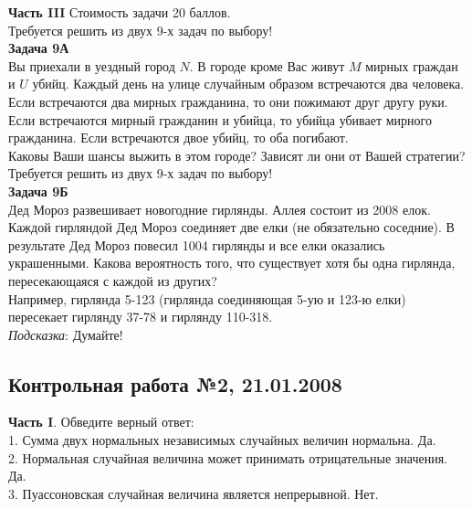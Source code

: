 \documentclass[12pt, a4paper]{article}\usepackage[]{graphicx}\usepackage[]{color}
\begin{document}
\textbf{Часть III} Стоимость задачи 20 баллов. \\

Требуется решить \textbf{} из двух 9-х задач по
выбору! \\


\textbf{Задача 9А} \\
Вы приехали в уездный город $N$. В городе кроме Вас живут $M$ мирных граждан и $U$ убийц. Каждый день на улице случайным образом встречаются два человека. Если встречаются два мирных гражданина, то они пожимают друг другу руки. Если встречаются мирный гражданин и убийца, то убийца убивает мирного гражданина. Если встречаются двое убийц, то оба погибают. \\
Каковы Ваши шансы выжить в этом городе? Зависят ли они от Вашей стратегии?  \\



Требуется решить \textbf{} из двух 9-х задач по
выбору! \\



\textbf{Задача 9Б} \\
Дед Мороз развешивает новогодние гирлянды. Аллея состоит из 2008 елок. Каждой гирляндой Дед Мороз соединяет две елки (не обязательно соседние). В результате Дед Мороз повесил 1004 гирлянды и все елки оказались украшенными. Какова вероятность того, что существует хотя бы одна гирлянда, пересекающаяся с каждой из других? \\
Например, гирлянда 5-123 (гирлянда соединяющая 5-ую и 123-ю елки) пересекает гирлянду 37-78 и гирлянду 110-318. \\

\emph{Подсказка}: Думайте! \\


\subsection{Контрольная работа №2, 21.01.2008}

\textbf{Часть I}. Обведите верный ответ: \\

1. Сумма двух нормальных независимых случайных величин нормальна.
Да. \\

2. Нормальная случайная величина может принимать отрицательные
значения. Да. \\

3. Пуассоновская случайная величина является непрерывной. Нет.
\\
\end{document}
